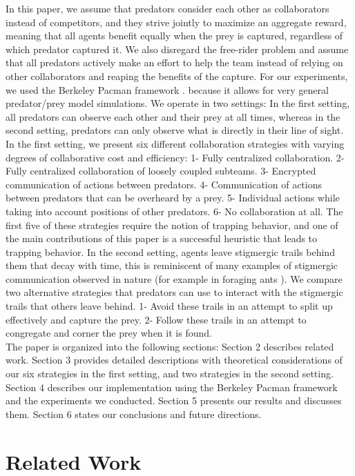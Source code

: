 \documentclass[11pt]{article}
\begin{document}
\begin{multicols}{2}
In this paper, we assume that predators consider each other as collaborators instead of competitors, and they strive jointly to maximize an aggregate reward, meaning that all agents benefit equally when the prey is captured, regardless of which predator captured it. We also disregard the free-rider problem and assume that all predators actively make an effort to help the team instead of relying on other collaborators and reaping the benefits of the capture. For our experiments, we used the Berkeley Pacman framework \cite{Pacman}. because it allows for very general predator/prey model simulations. We operate in two settings: In the first setting, all predators can observe each other and their prey at all times, whereas in the second setting, predators can only observe what is directly in their line of sight. In the first setting, we present six different collaboration strategies with varying degrees of collaborative cost and efficiency: 1- Fully centralized collaboration. 2- Fully centralized collaboration of loosely coupled subteams. 3- Encrypted communication of actions between predators. 4- Communication of actions between predators that can be overheard by a prey. 5- Individual actions while taking into account positions of other predators. 6- No collaboration at all. The first five of these strategies require the notion of trapping behavior, and one of the main contributions of this paper is a successful heuristic that leads to trapping behavior. In the second setting, agents leave stigmergic trails behind them that decay with time, this is reminiscent of many examples of stigmergic communication observed in nature (for example in foraging ants \cite{beckers1992trails}). We compare two alternative strategies that predators can use to interact with the stigmergic trails that others leave behind. 1- Avoid these trails in an attempt to split up effectively and capture the prey. 2- Follow these trails in an attempt to congregate and corner the prey when it is found.\\
\indent The paper is organized into the following sections: Section 2 describes related work. Section 3 provides detailed descriptions with theoretical considerations of our six strategies in the first setting, and two strategies in the second setting. Section 4 describes our implementation using the Berkeley Pacman framework and the experiments we conducted. Section 5 presents our results and discusses them. Section 6 states our conclusions and future directions. 

\section{Related Work}


\end{multicols}
\end{document}
